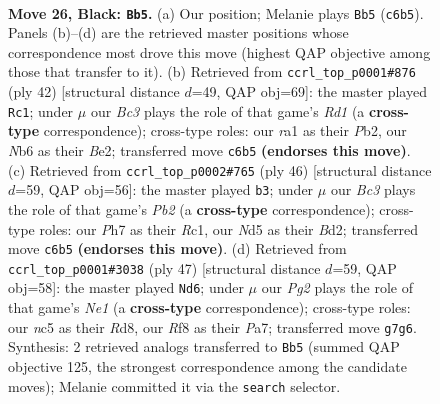 \documentclass[11pt]{article}
\begin{document}
\clearpage

\begin{figure}[p]\centering
\begin{subfigure}{0.46\textwidth}\centering
\resizebox{\linewidth}{!}{%
\newchessgame
\chessboard[
  setfen={5r1k/4rppp/1nb1p3/p1Nn2P1/8/1P2PR2/P5PP/RN1B2K1 b - - 2 26},
  showmover=false,
  pgfstyle=straightmove, color=movearrow, markmove={c6-b5}
]}
\caption{}
\end{subfigure}\hfill
\begin{subfigure}{0.46\textwidth}\centering
\resizebox{\linewidth}{!}{%
\newchessgame
\chessboard[
  setfen={r1b1rk2/1p3pp1/2p4p/p1n5/P2N3P/R3PP2/1P2B1P1/3R2K1 w - - 1 22},
  showmover=false,
  pgfstyle=straightmove, color=movearrow, markmove={d1-c1}
]}
\caption{}
\end{subfigure}
\\[4pt]
\begin{subfigure}{0.46\textwidth}\centering
\resizebox{\linewidth}{!}{%
\newchessgame
\chessboard[
  setfen={2r3k1/p2rb1p1/1n2pp1p/2p4P/6P1/2NP1R2/PP1BKP2/2R5 w - - 0 24},
  showmover=false,
  pgfstyle=straightmove, color=movearrow, markmove={b2-b3}
]}
\caption{}
\end{subfigure}\hfill
\begin{subfigure}{0.46\textwidth}\centering
\resizebox{\linewidth}{!}{%
\newchessgame
\chessboard[
  setfen={3rnk2/pp2rppp/2p5/4n3/PP2P3/1NRP3P/4B1P1/5RK1 b - - 0 24},
  showmover=false,
  pgfstyle=straightmove, color=movearrow, markmove={e8-d6}
]}
\caption{}
\end{subfigure}
\caption{\textbf{Move 26, Black: \texttt{Bb5}.} (a) Our position; Melanie plays \texttt{Bb5} (\texttt{c6b5}). Panels (b)--(d) are the retrieved master positions whose correspondence most drove this move (highest QAP objective among those that transfer to it). (b) Retrieved from \texttt{ccrl\_top\_p0001\#876} (ply 42) [structural distance $d$=49, QAP obj=69]: the master played \texttt{Rc1}; under $\mu$ our \emph{Bc3} plays the role of that game's \emph{Rd1} (a \textbf{cross-type} correspondence); cross-type roles: our \emph{r}a1 as their \emph{P}b2, our \emph{N}b6 as their \emph{B}e2; transferred move \texttt{c6b5} \textbf{(endorses this move)}. (c) Retrieved from \texttt{ccrl\_top\_p0002\#765} (ply 46) [structural distance $d$=59, QAP obj=56]: the master played \texttt{b3}; under $\mu$ our \emph{Bc3} plays the role of that game's \emph{Pb2} (a \textbf{cross-type} correspondence); cross-type roles: our \emph{P}h7 as their \emph{R}c1, our \emph{N}d5 as their \emph{B}d2; transferred move \texttt{c6b5} \textbf{(endorses this move)}. (d) Retrieved from \texttt{ccrl\_top\_p0001\#3038} (ply 47) [structural distance $d$=59, QAP obj=58]: the master played \texttt{Nd6}; under $\mu$ our \emph{Pg2} plays the role of that game's \emph{Ne1} (a \textbf{cross-type} correspondence); cross-type roles: our \emph{n}c5 as their \emph{R}d8, our \emph{R}f8 as their \emph{P}a7; transferred move \texttt{g7g6}. Synthesis: 2 retrieved analogs transferred to \texttt{Bb5} (summed QAP objective 125, the strongest correspondence among the candidate moves); Melanie committed it via the \texttt{search} selector.}
\label{fig:thought-m51}
\end{figure}
\end{document}
